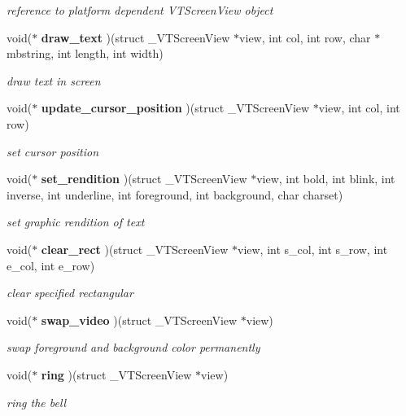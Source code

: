 \begin{CompactItemize}
\begin{CompactList}\small\item\em reference to platform dependent VTScreen\-View object\item\end{CompactList}\item 
void($\ast$ {\bf draw\_\-text} )(struct \_\-VTScreen\-View $\ast$view, int col, int row, char $\ast$mbstring, int length, int width)
\begin{CompactList}\small\item\em draw text in screen\item\end{CompactList}\item 
void($\ast$ {\bf update\_\-cursor\_\-position} )(struct \_\-VTScreen\-View $\ast$view, int col, int row)
\begin{CompactList}\small\item\em set cursor position\item\end{CompactList}\item 
void($\ast$ {\bf set\_\-rendition} )(struct \_\-VTScreen\-View $\ast$view, int bold, int blink, int inverse, int underline, int foreground, int background, char charset)
\begin{CompactList}\small\item\em set graphic rendition of text\item\end{CompactList}\item 
void($\ast$ {\bf clear\_\-rect} )(struct \_\-VTScreen\-View $\ast$view, int s\_\-col, int s\_\-row, int e\_\-col, int e\_\-row)
\begin{CompactList}\small\item\em clear specified rectangular\item\end{CompactList}\item 
void($\ast$ {\bf swap\_\-video} )(struct \_\-VTScreen\-View $\ast$view)
\begin{CompactList}\small\item\em swap foreground and background color permanently\item\end{CompactList}\item 
void($\ast$ {\bf ring} )(struct \_\-VTScreen\-View $\ast$view)
\begin{CompactList}\small\item\em ring the bell\item\end{CompactList}\item 

\end{CompactItemize}
